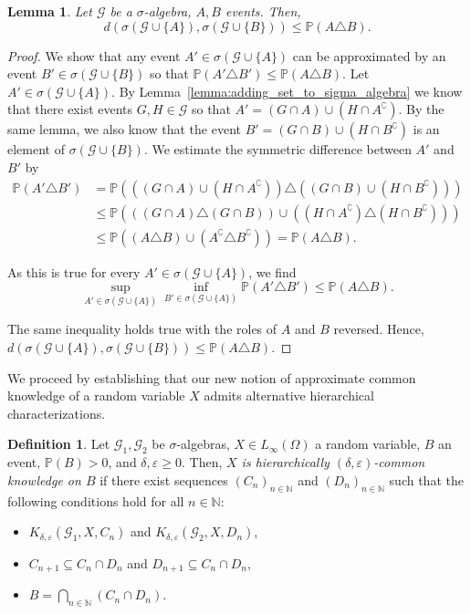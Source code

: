 \documentclass[a4paper, 10pt]{article}
\numberwithin{theorem}{section}
\newtheorem{lemma}[theorem]{Lemma}
\theoremstyle{definition}
\newtheorem{definition}[theorem]{Definition}
\newcommand{\N}{\mathbb{N}}
\newcommand{\G}{\mathcal{G}}
\renewcommand{\epsilon}{\varepsilon}
\renewcommand{\P}{\mathbb{P}}
\begin{document}
\begin{lemma}\label{lemma:distance_for_sigma_algebras_augmented_by_different_sets}
	Let $\G$ be a $\sigma$-algebra, $A,B$ events. Then, 
	$$d(\sigma(\G \cup \{A\}), \sigma(\G \cup \{B\})) \leq \P(A \triangle B ).$$
\end{lemma}

\begin{proof}
    We show that any event $A' \in \sigma(\G \cup \{A\})$ can be approximated by an event $B' \in \sigma(\G \cup \{B\})$ so that $\P(A' \triangle B') \leq \P(A \triangle B )$.
    Let $A' \in \sigma(\G \cup \{A\})$. By Lemma~\ref{lemma:adding_set_to_sigma_algebra} we know that there exist events $G, H \in \G$ so that $A'= (G \cap A) \cup (H \cap A^\complement)$. By the same lemma, we also know that the event $B'= (G \cap B) \cup (H \cap B^\complement)$ is an element of $\sigma(\G \cup \{B\})$. We estimate the symmetric difference between $A'$ and $B'$ by
	\begin{align*}
		\P(A' \triangle B')& = \P(( (G \cap A) \cup (H \cap A^\complement)) \triangle ((G \cap B) \cup (H \cap B^\complement))) \\
        &\leq \P(( (G \cap A) \triangle (G \cap B) ) \cup ( (H \cap A^\complement) \triangle (H \cap B^\complement) ) )\\
        & \leq \P((A \triangle B) \cup (A^\complement \triangle B^\complement)) = \P(A\triangle B).
	\end{align*}
    
    As this is true for every $A' \in  \sigma(\G \cup \{A\})$, we find $$ \sup_{A' \in \sigma(\G \cup \{A\})} \inf_{B'\in \sigma(\G \cup \{A\})} \P(A' \triangle B') \leq \P(A \triangle B ).$$

    
    The same inequality holds true with the roles of $A$ and $B$ reversed. Hence,  $d(\sigma(\G \cup \{A\}), \sigma(\G \cup \{B\})) \leq \P(A \triangle B ).$
\end{proof}


We proceed by establishing that our new notion of approximate common knowledge of a random variable $X$ admits alternative hierarchical characterizations.

\begin{definition}
	Let $\G_1,\G_2$ be $\sigma$-algebras, $X \in L_\infty(\Omega)$ a random variable, $B$ an event, $\P(B)>0$, and $\delta,\epsilon \geq 0$. Then, \emph{$X$ is hierarchically $(\delta, \epsilon)$-common knowledge on $B$} if there exist sequences $(C_n)_{n\in \N}$ and $(D_n)_{n\in \N}$ such that the following conditions hold for all $n \in \N$:
    \begin{itemize}
        \item $K_{\delta,\epsilon}(\G_1, X, C_n)$ and $K_{\delta,\epsilon}(\G_2,X,D_n)$,  
        \item $C_{n+1} \subseteq C_n \cap D_n$ and $D_{n+1} \subseteq C_n \cap D_n$, 
        \item $B=\bigcap_{n\in \N} \left( C_n \cap D_n \right)$.
    \end{itemize}
\end{definition}
\end{document}
